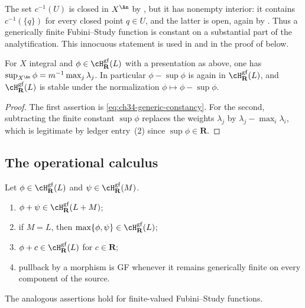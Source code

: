The set $c^{-1}(U)$ is closed in $X^{\An}$ by
, but it has nonempty interior: it
contains $c^{-1}(\{q\})$ for every closed point $q\in U$, and the
latter is open, again by .  Thus a
generically finite Fubini--Study function is constant on a substantial part
of the analytification.  This innocuous statement is used in
 and in the proof of
 below.

\begin{corollary}
\label{cor:ch34-generic-constancy}
For $X$ integral and $\phi\in\cH^{\mathrm{gf}}_{\mathbf R}(L)$ with a
presentation as above, one has
$\sup_{X^{\An}}\phi=m^{-1}\max_j\lambda_j$.  In particular
$\phi-\sup\phi$ is again in $\cH^{\mathrm{gf}}_{\mathbf R}(L)$, and
$\cH^{\mathrm{gf}}_{\mathbf R}(L)$ is stable under the normalization
$\phi\mapsto\phi-\sup\phi$.
\end{corollary}

\begin{proof}
The first assertion is \eqref{eq:ch34-generic-constancy}.  For the second,
subtracting the finite constant $\sup\phi$ replaces the weights
$\lambda_j$ by $\lambda_j-\max_i\lambda_i$, which is legitimate by
ledger entry~(2) since $\sup\phi\in\mathbf R$.
\end{proof}
\subsection{The operational calculus}

\begin{lemma}\label{lem:gf-fs-operations}
Let $\phi\in\cH^{\mathrm{gf}}_\mathbf R(L)$ and
$\psi\in\cH^{\mathrm{gf}}_\mathbf R(M)$.
\begin{enumerate}
\item $\phi+\psi\in\cH^{\mathrm{gf}}_\mathbf R(L+M)$;
\item if $M=L$, then
      $\max\{\phi,\psi\}\in\cH^{\mathrm{gf}}_\mathbf R(L)$;
\item $\phi+c\in\cH^{\mathrm{gf}}_\mathbf R(L)$ for $c\in\mathbf R$;
\item pullback by a morphism is GF whenever it remains generically finite on
      every component of the source.
\end{enumerate}
The analogous assertions hold for finite-valued Fubini--Study functions.
\end{lemma}

